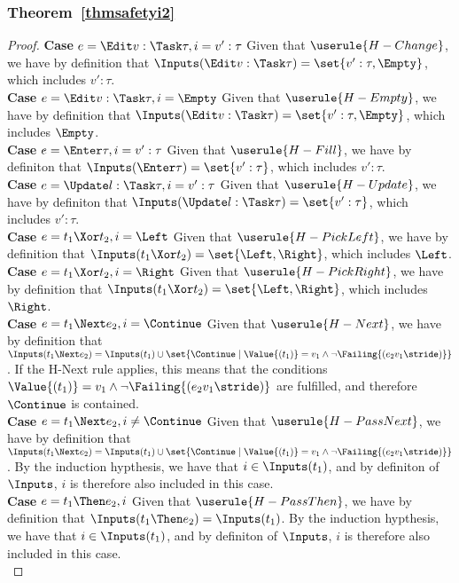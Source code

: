 \subsubsection{Theorem~\ref{thmsafetyi2}}
\begin{proof}

  \noindent\textbf{Case} $e=\Edit v:\Task\tau, i= v':\tau$ Given that $\userule{H-Change}$, we have by definition that $\Inputs(\Edit v:\Task\tau) = \set{v':\tau,\Empty}$, which includes $v':\tau$.\\
  \noindent\textbf{Case} $e=\Edit v:\Task\tau, i= \Empty$ Given that $\userule{H-Empty}$, we have by definition that $\Inputs(\Edit v:\Task\tau) = \set{v':\tau,\Empty}$, which includes $\Empty$.\\
  \noindent\textbf{Case} $e=\Enter \tau, i= v':\tau$ Given that $\userule{H-Fill}$, we have by definiton that $\Inputs(\Enter \tau) = \set{v':\tau }$, which includes $v':\tau$.\\
  \noindent\textbf{Case} $e=\Update l:\Task\tau, i= v':\tau$ Given that $\userule{H-Update}$, we have by definiton that $\Inputs(\Update l:\Task\tau)= \set{v':\tau }$, which includes $v':\tau$.\\
  \noindent\textbf{Case} $e=t_1\Xor t_2 , i= \Left$ Given that $\userule{H-PickLeft}$, we have by definition that $\Inputs(t_1\Xor t_2) = \set{ \Left,\Right}$, which includes $\Left$.\\
  \noindent\textbf{Case} $e=t_1\Xor t_2 , i= \Right$ Given that $\userule{H-PickRight}$, we have by definition that $\Inputs(t_1\Xor t_2) = \set{ \Left,\Right}$, which includes $\Right$.\\
  \noindent\textbf{Case} $e=t_1\Next e_2 , i= \Continue $ Given that $\userule{H-Next}$, we have by definition that $\Inputs(t_1\Next e_2) = \Inputs(t_1) \cup \set{\Continue\mid \Value{(t_1)} = v_1 \wedge \neg\Failing{(e_2 v_1\stride)}}$. If the H-Next rule applies, this means that the conditions $\Value{(t_1)} = v_1 \wedge \neg\Failing{(e_2 v_1\stride)}$ are fulfilled, and therefore $\Continue$ is contained. \\
  \noindent\textbf{Case} $e=t_1\Next e_2 , i\neq\Continue$ Given that $\userule{H-PassNext}$, we have by definition that $\Inputs(t_1\Next e_2) = \Inputs(t_1) \cup \set{\Continue\mid \Value{(t_1)} = v_1 \wedge \neg\Failing{(e_2 v_1\stride)}}$. By the induction hypthesis, we have that $i\in \Inputs(t_1)$, and by definiton of $\Inputs$, $i$ is therefore also included in this case.\\
  \noindent\textbf{Case} $e=t_1\Then e_2 , i$ Given that $\userule{H-PassThen}$, we have by definition that $\Inputs(t_1\Then e_2)= \Inputs(t_1)$. By the induction hypthesis, we have that $i\in \Inputs(t_1)$, and by definiton of $\Inputs$, $i$ is therefore also included in this case.\\

\end{proof}
